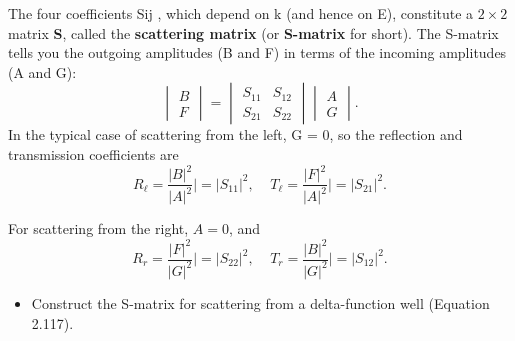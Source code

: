 \documentclass[fleqn]{article}
\begin{document}
The four coefficients Sij , which depend on k (and hence on E), constitute a $2 \times 2$ matrix \textbf{S}, called
the \textbf{scattering matrix} (or \textbf{S-matrix} for short). The S-matrix tells you the outgoing
amplitudes (B and F) in terms of the incoming amplitudes (A and G):
$$\begin{vmatrix}
  B \\
  F
\end{vmatrix}=\begin{vmatrix}
  S_{11} & S_{12} \\
  S_{21} & S_{22}
\end{vmatrix} \begin{vmatrix}
  A \\
  G
\end{vmatrix}.$$
In the typical case of scattering from the left, G = 0, so the reflection and transmission
coefficients are 
$$R_{\ell}=\dfrac{|B|^2}{|A|^2}\Big|=|S_{11}|^2, ~~~~~ T_{\ell}=\dfrac{|F|^2}{|A|^2}\Big|=|S_{21}|^2.$$

For scattering from the right, $A=0$, and 
$$R_r=\dfrac{|F|^2}{|G|^2}\Big|=|S_{22}|^2, ~~~~~ T_r=\dfrac{|B|^2}{|G|^2}\Big|=|S_{12}|^2.$$

\begin{itemize}
  \item Construct the S-matrix for scattering from a delta-function well (Equation 2.117).

\end{itemize}
\end{document}
